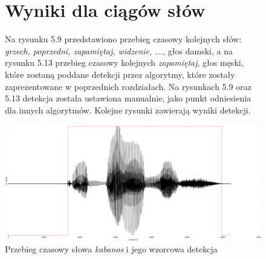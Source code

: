 \documentclass[eng,printmode]{mgr}
\begin{document}
\begin{figure}

	\section{Wyniki dla ciągów słów}
	Na rysunku 5.9 przedstawiono przebieg czasowy kolejnych słów: \emph{grzech, poprzedni, zapamiętaj, widzenie, ...}, głos damski, a na rysunku 5.13 przebieg czasowy kolejnych  \emph{zapamiętaj}, głos męski, które zostaną poddane detekcji przez algorytmy, które zostały zaprezentowane w poprzednich rozdziałach. Na rysunkach 5.9 oraz 5.13 detekcja została ustawiona manualnie, jako punkt odniesienia dla innych algorytmów.
	Kolejne rysunki zawierają wyniki detekcji.
	\begin{center}
		\includegraphics[scale=0.2]{kabanos.png}
		\caption{Przebieg czasowy słowa \emph{kabanos} i jego wzorcowa detekcja}\vspace{5mm}
	\end{center}
\end{figure}
\end{document}
